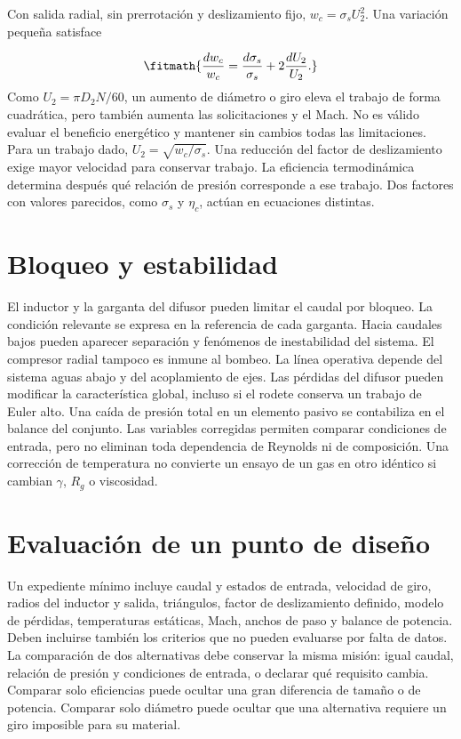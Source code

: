 \documentclass[10pt,openany]{book}
\begin{document}
Con salida radial, sin prerrotación y deslizamiento fijo, \(w_c=\sigma_sU_2^2\). Una variación pequeña satisface

\[
\fitmath{\frac{dw_c}{w_c}=\frac{d\sigma_s}{\sigma_s}+2\frac{dU_2}{U_2}.}
\]
Como \(U_2=\pi D_2N/60\), un aumento de diámetro o giro eleva el trabajo de forma cuadrática, pero también aumenta las solicitaciones y el Mach. No es válido evaluar el beneficio energético y mantener sin cambios todas las limitaciones.
Para un trabajo dado, \(U_2=\sqrt{w_c/\sigma_s}\). Una reducción del factor de deslizamiento exige mayor velocidad para conservar trabajo. La eficiencia termodinámica determina después qué relación de presión corresponde a ese trabajo. Dos factores con valores parecidos, como \(\sigma_s\) y \(\eta_c\), actúan en ecuaciones distintas.

\section{Bloqueo y estabilidad}

El inductor y la garganta del difusor pueden limitar el caudal por bloqueo. La condición relevante se expresa en la referencia de cada garganta. Hacia caudales bajos pueden aparecer separación y fenómenos de inestabilidad del sistema. El compresor radial tampoco es inmune al bombeo.
La línea operativa depende del sistema aguas abajo y del acoplamiento de ejes. Las pérdidas del difusor pueden modificar la característica global, incluso si el rodete conserva un trabajo de Euler alto. Una caída de presión total en un elemento pasivo se contabiliza en el balance del conjunto.
Las variables corregidas permiten comparar condiciones de entrada, pero no eliminan toda dependencia de Reynolds ni de composición. Una corrección de temperatura no convierte un ensayo de un gas en otro idéntico si cambian \(\gamma\), \(R_g\) o viscosidad.

\section{Evaluación de un punto de diseño}

Un expediente mínimo incluye caudal y estados de entrada, velocidad de giro, radios del inductor y salida, triángulos, factor de deslizamiento definido, modelo de pérdidas, temperaturas estáticas, Mach, anchos de paso y balance de potencia. Deben incluirse también los criterios que no pueden evaluarse por falta de datos.
La comparación de dos alternativas debe conservar la misma misión: igual caudal, relación de presión y condiciones de entrada, o declarar qué requisito cambia. Comparar solo eficiencias puede ocultar una gran diferencia de tamaño o de potencia. Comparar solo diámetro puede ocultar que una alternativa requiere un giro imposible para su material.
\end{document}
